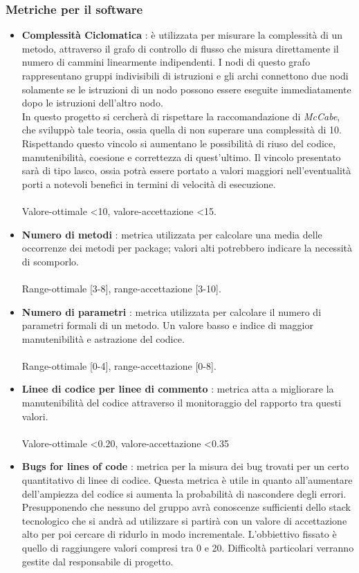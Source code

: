 		\subsubsection{Metriche per il software}
			\begin{itemize}
				\item \textbf{Complessità Ciclomatica} \textnormal{: è utilizzata per misurare la complessità di un metodo, attraverso il grafo di controllo di flusso che misura direttamente il numero di cammini linearmente indipendenti. I nodi di questo grafo rappresentano gruppi indivisibili di istruzioni e gli archi connettono due nodi solamente se le istruzioni di un nodo possono essere eseguite immediatamente dopo le istruzioni dell'altro nodo.\\
				In questo progetto si cercherà di rispettare la raccomandazione di \textit{McCabe}, che sviluppò tale teoria, ossia quella di non superare una complessità di 10. Rispettando questo vincolo si aumentano le possibilità di riuso del codice, manutenibilità, coesione e correttezza di quest'ultimo. Il vincolo presentato sarà di tipo lasco, ossia potrà essere portato a valori maggiori nell'eventualità porti a notevoli benefici in termini di velocità di esecuzione.\\ \\
				Valore-ottimale <10, valore-accettazione <15.}
				\item \textbf{Numero di metodi} \textnormal{: metrica utilizzata per calcolare una media delle occorrenze dei metodi per package; valori alti potrebbero indicare la necessità di scomporlo.\\ \\ 					Range-ottimale [3-8], range-accettazione [3-10].}
				\item \textbf{Numero di parametri} \textnormal{: metrica utilizzata per calcolare il numero di parametri formali di un metodo. Un valore basso e indice di maggior manutenibilità e astrazione del codice.\\ \\
				Range-ottimale [0-4], range-accettazione [0-8].}
				\item \textbf{Linee di codice per linee di commento} \textnormal{: metrica atta a migliorare la manutenibilità del codice attraverso il monitoraggio del rapporto tra questi valori.\\ \\
				Valore-ottimale <0.20, valore-accettazione <0.35}
				\item \textbf{Bugs for lines of code} \textnormal{: metrica per la misura dei bug trovati per un certo quantitativo di linee di codice. Questa metrica è utile in quanto all'aumentare dell'ampiezza del codice si aumenta la probabilità di nascondere degli errori. Presupponendo che nessuno del gruppo avrà conoscenze sufficienti dello stack tecnologico che si andrà ad utilizzare si partirà con un valore di accettazione alto per poi cercare di ridurlo in modo incrementale. L'obbiettivo fissato è quello di raggiungere valori compresi tra 0 e 20. Difficoltà particolari verranno gestite dal responsabile di progetto.}

\end{itemize}
